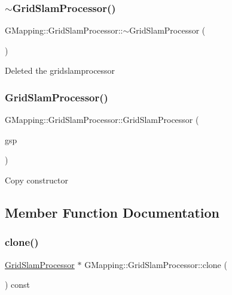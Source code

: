 \subsubsection{\texorpdfstring{$\sim$\+Grid\+Slam\+Processor()}{~GridSlamProcessor()}}
{\footnotesize\ttfamily G\+Mapping\+::\+Grid\+Slam\+Processor\+::$\sim$\+Grid\+Slam\+Processor (\begin{DoxyParamCaption}{ }\end{DoxyParamCaption})\hspace{0.3cm}{\ttfamily [virtual]}}

Deleted the gridslamprocessor \mbox{\label{classGMapping_1_1GridSlamProcessor_a7800b02d50b6b5d7c8b226e3c361ca2c}} 
\subsubsection{\texorpdfstring{Grid\+Slam\+Processor()}{GridSlamProcessor()}\hspace{0.1cm}{\footnotesize\ttfamily [3/3]}}
{\footnotesize\ttfamily G\+Mapping\+::\+Grid\+Slam\+Processor\+::\+Grid\+Slam\+Processor (\begin{DoxyParamCaption}\item[{const \hyperlink{classGMapping_1_1GridSlamProcessor}{Grid\+Slam\+Processor} \&}]{gsp }\end{DoxyParamCaption})\hspace{0.3cm}{\ttfamily [protected]}}

Copy constructor 

\subsection{Member Function Documentation}
\mbox{\label{classGMapping_1_1GridSlamProcessor_a2e5270f6e87161189f19e5880db792ca}} 
\subsubsection{\texorpdfstring{clone()}{clone()}}
{\footnotesize\ttfamily \hyperlink{classGMapping_1_1GridSlamProcessor}{Grid\+Slam\+Processor} $\ast$ G\+Mapping\+::\+Grid\+Slam\+Processor\+::clone (\begin{DoxyParamCaption}{ }\end{DoxyParamCaption}) const}

